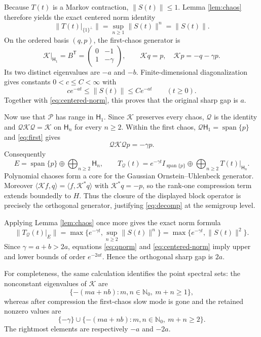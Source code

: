 \documentclass[11pt]{article}
\theoremstyle{remark}
\newcommand{\HH}{\mathsf H}
\newcommand{\K}{\mathcal K}
\newcommand{\Pj}{\mathcal P}
\newcommand{\Qj}{\mathcal Q}
\begin{document}
Because $T(t)$ is a Markov contraction, $\|S(t)\|\leq1$.  Lemma
\ref{lem:chaos} therefore yields the exact centered norm identity
\begin{equation}\label{eq:centered-norm}
 \|T(t)|_{\{1\}^{\perp}}\|
 =\sup_{n\geq1}\|S(t)\|^n=\|S(t)\|.
\end{equation}
On the ordered basis $(q,p)$, the first-chaos generator is
\begin{equation}\label{eq:first}
 \K|_{\HH_1}=B^{\mathsf T}
 =\begin{pmatrix}0&-1\\1&-\gamma\end{pmatrix},
 \qquad \K q=p,\quad \K p=-q-\gamma p.
\end{equation}
Its two distinct eigenvalues are $-a$ and $-b$.  Finite-dimensional
diagonalization gives constants $0<c\leq C<\infty$ with
\[
 c e^{-at}\leq\|S(t)\|\leq C e^{-at}
 \qquad(t\geq0).
\]
Together with \eqref{eq:centered-norm}, this proves that the original sharp
gap is $a$.

Now use that $\Pj$ has range in $\HH_1$.  Since $\K$ preserves every chaos,
$\Qj$ is the identity and $\Qj\K\Qj=\K$ on $\HH_n$ for every $n\geq2$.
Within the first chaos, $\Qj\HH_1=\operatorname{span}\{p\}$ and
\eqref{eq:first} gives
\[
 \Qj\K\Qj p=-\gamma p.
\]
Consequently
\begin{equation}\label{eq:decomp}
 E=\operatorname{span}\{p\}\oplus\bigoplus_{n\geq2}\HH_n,
 \qquad
 T_{\Qj}(t)=e^{-\gamma t}I_{\operatorname{span}\{p\}}
 \oplus\bigoplus_{n\geq2}T(t)|_{\HH_n}.
\end{equation}
Polynomial chaoses form a core for the Gaussian Ornstein--Uhlenbeck
generator.  Moreover $\langle\K f,q\rangle=\langle f,\K^*q\rangle$ with
$\K^*q=-p$, so the rank-one compression term extends boundedly to $H$.
Thus the closure of the displayed block operator is precisely the
orthogonal generator, justifying \eqref{eq:decomp} at the semigroup level.

Applying Lemma \ref{lem:chaos} once more gives the exact norm formula
\begin{equation}\label{eq:qnorm}
 \|T_{\Qj}(t)|_E\|
 =\max\{e^{-\gamma t},\sup_{n\geq2}\|S(t)\|^n\}
 =\max\{e^{-\gamma t},\|S(t)\|^2\}.
\end{equation}
Since $\gamma=a+b>2a$, equations \eqref{eq:qnorm} and
\eqref{eq:centered-norm} imply upper and lower bounds of order $e^{-2at}$.
Hence the orthogonal sharp gap is $2a$.

For completeness, the same calculation identifies the point spectral sets:
the nonconstant eigenvalues of $\K$ are
\[
 \{-(ma+nb):m,n\in\mathbb N_0,\ m+n\geq1\},
\]
whereas after compression the first-chaos slow mode is gone and the retained
nonzero values are
\[
 \{-\gamma\}\cup
 \{-(ma+nb):m,n\in\mathbb N_0,\ m+n\geq2\}.
\]
The rightmost elements are respectively $-a$ and $-2a$.
\end{document}

